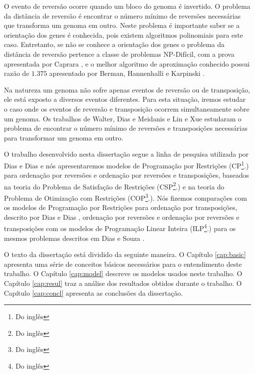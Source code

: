 
O evento de reversão ocorre quando um bloco do genoma é invertido. O
problema da distância de reversão é encontrar o número mínimo de
reversões necessárias que transforma um genoma em outro. Neste
problema é importante saber se a orientação dos genes é conhecida,
pois existem algoritmos polinomiais para este caso. Entretanto, se não
se conhece a orientação dos genes o problema da distância de reversão
pertence a classe de problemas NP-Difícil, com a prova apresentada por
Caprara \cite{Caprara*1997}, e o melhor algoritmo de aproximação
conhecido possui razão de $1.375$ apresentado por Berman,
Hannenhalli e Karpinski \cite{BermanHannenhalliKarpinski*2002}.

Na natureza um genoma não sofre apenas eventos de reversão ou de
transposição, ele está exposto a diversos eventos diferentes. Para
esta situação, iremos estudar o caso onde os eventos de reversão e
transposição ocorrem simultaneamente sobre um genoma. Os trabalhos de
Walter, Dias e
Meidanis \cite{MeidanisWalterDias*2002,WalterDiasMeidanis*1998} e Lin
e Xue \cite{LinXue*1999} estudaram o problema de encontrar o número
mínimo de reversões e transposições necessárias para transformar um
genoma em outro.

O trabalho desenvolvido nesta dissertação segue a linha de pesquisa
utilizada por Dias e Dias \cite{DiasDias*2009} e nós apresentaremos
modelos de Programação por Restrições (CP\footnote{Do
inglês }.) para ordenação por reversões e
ordenação por reversões e transposições, baseados na teoria do
Problema de Satisfação de Restrições (CSP\footnote{Do
inglês }.) e na teoria do
Problema de Otimização com Restrições (COP\footnote{Do
inglês }.). Nós fizemos
comparações com os modelos de Programação por Restrições para
ordenação por transposições, descrito por Dias e
Dias \cite{DiasDias*2009}, ordenação por reversões e ordenação por
reversões e transposições com os modelos de Programação Linear Inteira
(ILP\footnote{Do inglês }.) para os
mesmos problemas descritos em Dias e Souza \cite{DiasSouza*2007}.

O texto da dissertação está dividido da seguinte maneira. O
Capítulo \ref{cap:basic} apresenta uma série de conceitos básicos
necessários para o entendimento deste trabalho. O
Capítulo \ref{cap:model} descreve os modelos usados neste trabalho. O
Capítulo \ref{cap:resul} traz a análise dos resultados obtidos durante
o trabalho. O Capítulo \ref{cap:concl} apresenta as conclusões da
dissertação.

